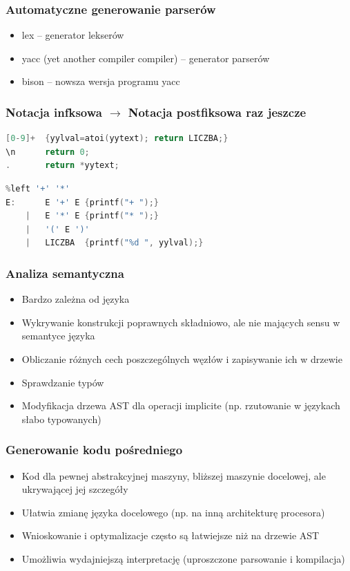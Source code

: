 \documentclass{beamer}
\begin{document}
	\begin{frame}
		\frametitle{Automatyczne generowanie parserów}
		\begin{itemize}
			\item lex -- generator lekserów
			\item yacc (yet another compiler compiler) -- generator parserów
			\item bison -- nowsza wersja programu yacc
		\end{itemize}
	\end{frame}
	
	\begin{frame}[fragile]
		\frametitle{Notacja infksowa $\rightarrow$ Notacja postfiksowa raz jeszcze}
		\begin{lstlisting}[language=c]
[0-9]+  {yylval=atoi(yytext); return LICZBA;}
\n      return 0;
.       return *yytext;
		\end{lstlisting}
		\begin{lstlisting}[language=c]
%token LICZBA
%left '+' '*'
E:  	E '+' E {printf("+ ");}
	|	E '*' E {printf("* ");}
	|	'(' E ')'
	|	LICZBA	{printf("%d ", yylval);}
		\end{lstlisting}

	\end{frame}
	
	\begin{frame}
		\frametitle{Analiza semantyczna}
		\begin{itemize}
			\item Bardzo zależna od języka
			\item Wykrywanie konstrukcji poprawnych składniowo, ale nie mających sensu w semantyce języka
			\item Obliczanie różnych cech poszczególnych węzłów i zapisywanie ich w drzewie
			\item Sprawdzanie typów
			\item Modyfikacja drzewa AST dla operacji implicite (np. rzutowanie w językach słabo typowanych)
		\end{itemize}
	\end{frame}
	
	\begin{frame}
		\frametitle{Generowanie kodu pośredniego}
		\begin{itemize}
			\item Kod dla pewnej abstrakcyjnej maszyny, bliższej maszynie docelowej, ale ukrywającej jej szczegóły
			\item Ułatwia zmianę języka docelowego (np. na inną architekturę procesora)
			\item Wnioskowanie i optymalizacje często są łatwiejsze niż na drzewie AST
			\item Umożliwia wydajniejszą interpretację (uproszczone parsowanie i kompilacja)
		\end{itemize}
	\end{frame}
	
\end{document}
